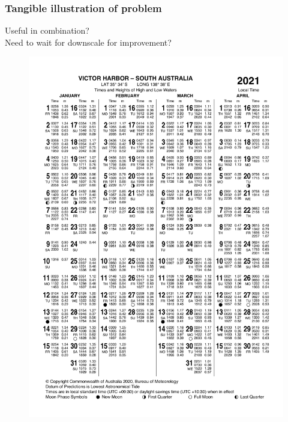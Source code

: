 \begin{frame}
\frametitle{Tangible illustration of problem}
\centering
Useful in combination?\\
Need to wait for downscale for improvement?
\begin{minipage}{0.45\textwidth}
    \begin{figure}      
    \includegraphics[trim={0 8cm 0 0},clip,height=\textheight]{figures/images/IDO59001_2021_SA_TP006.pdf}
    \end{figure}
\end{minipage}
\hfill
\begin{minipage}{0.45\textwidth}
    \begin{figure}      

\end{figure}
\end{minipage}
\end{frame}
